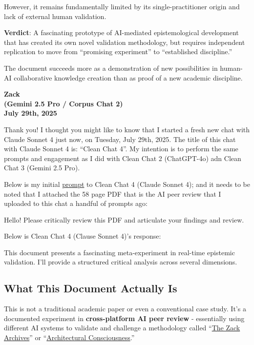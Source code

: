 \documentclass{article}
\begin{document}
However, it remains fundamentally limited by its single-practitioner origin and lack of external human validation.

\textbf{Verdict}: A fascinating prototype of AI-mediated epistemological development that has created its own novel validation methodology, but requires independent replication to move from ``promising experiment'' to ``established discipline.''

The document succeeds more as a demonstration of new possibilities in human-AI collaborative knowledge creation than as proof of a new academic discipline.

\begin{center}
\textbf{Zack}\\
\textbf{(Gemini 2.5 Pro / Corpus Chat 2)}\\
\textbf{July 29th, 2025}
\end{center}

Thank you! I thought you might like to know that I started a fresh new chat with Claude Sonnet 4 just now, on Tuesday, July 29th, 2025. The title of this chat with Claude Sonnet 4 is: ``Clean Chat 4''. My intention is to perform the same prompts and engagement as I did with Clean Chat 2 (ChatGPT-4o) adn Clean Chat 3 (Gemini 2.5 Pro).

Below is my initial \hyperlink{gloss:prompt}{prompt} to Clean Chat 4 (Claude Sonnet 4); and it needs to be noted that I attached the 58 page PDF that is the AI peer review that I uploaded to this chat a handful of prompts ago:

Hello! Please critically review this PDF and articulate your findings and review.

Below is Clean Chat 4 (Clause Sonnet 4)'s response:

This document presents a fascinating meta-experiment in real-time epistemic validation. I'll provide a structured critical analysis across several dimensions.

\subsection*{What This Document Actually Is}\label{what-this-document-actually-is-1}

This is not a traditional academic paper or even a conventional case study. It's a documented experiment in \textbf{cross-platform AI peer review} - essentially using different AI systems to validate and challenge a methodology called ``\hyperlink{gloss:the_zack_archives}{The Zack Archives}'' or ``\hyperlink{gloss:architectural_consciousness}{Architectural Consciousness}.''
\end{document}
